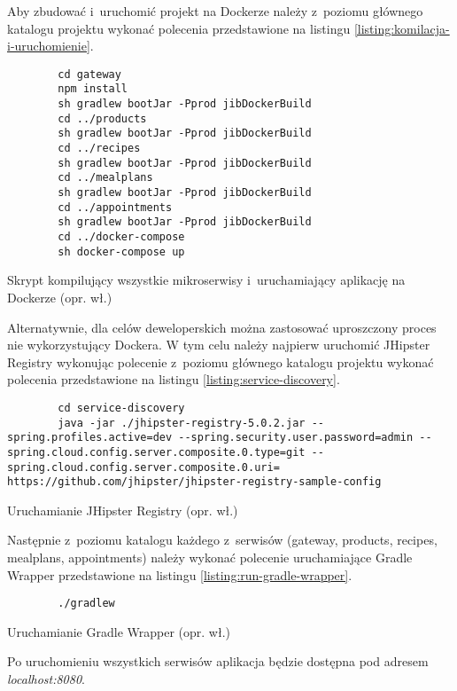 Aby zbudować i~uruchomić projekt na Dockerze należy z~poziomu głównego katalogu projektu
wykonać polecenia przedstawione na listingu \ref{listing:komilacja-i-uruchomienie}.
\begin{listing}[h!]
    \begin{verbatim}
        cd gateway
        npm install
        sh gradlew bootJar -Pprod jibDockerBuild
        cd ../products
        sh gradlew bootJar -Pprod jibDockerBuild
        cd ../recipes
        sh gradlew bootJar -Pprod jibDockerBuild
        cd ../mealplans
        sh gradlew bootJar -Pprod jibDockerBuild
        cd ../appointments
        sh gradlew bootJar -Pprod jibDockerBuild
        cd ../docker-compose
        sh docker-compose up
    \end{verbatim}
    \caption{Skrypt kompilujący wszystkie mikroserwisy i~uruchamiający aplikację na Dockerze (opr. wł.)} \label{listing:komilacja-i-uruchomienie}
\end{listing}

Alternatywnie, dla celów deweloperskich można zastosować uproszczony proces nie wykorzystujący Dockera.
W tym celu należy najpierw uruchomić JHipster Registry wykonując polecenie z~poziomu głównego katalogu projektu
wykonać polecenia przedstawione na listingu \ref{listing:service-discovery}.
\begin{listing}[h!]
    \begin{verbatim}
        cd service-discovery
        java -jar ./jhipster-registry-5.0.2.jar --spring.profiles.active=dev --spring.security.user.password=admin --spring.cloud.config.server.composite.0.type=git --spring.cloud.config.server.composite.0.uri= https://github.com/jhipster/jhipster-registry-sample-config
    \end{verbatim}
    \caption{Uruchamianie JHipster Registry (opr. wł.)} \label{listing:service-discovery}
\end{listing}

Następnie z~poziomu katalogu każdego z~serwisów (gateway, products, recipes, mealplans, appointments)
należy wykonać polecenie uruchamiające Gradle Wrapper przedstawione na listingu \ref{listing:run-gradle-wrapper}.
\begin{listing}[h!]
    \begin{verbatim}
        ./gradlew
    \end{verbatim}
    \caption{Uruchamianie Gradle Wrapper (opr. wł.)} \label{listing:run-gradle-wrapper}
\end{listing}

Po uruchomieniu wszystkich serwisów aplikacja będzie dostępna pod adresem \textit{localhost:8080}.

